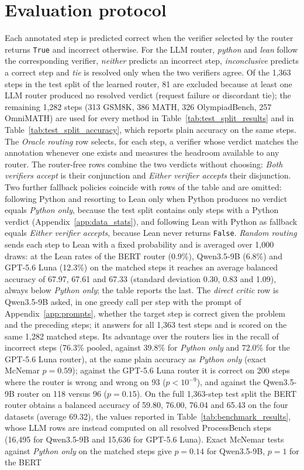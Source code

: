 \section{Evaluation protocol}
\label{app:evaluation}
Each annotated step is predicted correct when the verifier selected by the router returns \texttt{True} and incorrect otherwise. For the LLM router, \textit{python} and \textit{lean} follow the corresponding verifier, \textit{neither} predicts an incorrect step, \textit{inconclusive} predicts a correct step and \textit{tie} is resolved only when the two verifiers agree. Of the 1,363 steps in the test split of the learned router, 81 are excluded because at least one LLM router produced no resolved verdict (request failure or discordant tie); the remaining 1,282 steps (313 GSM8K, 386 MATH, 326 OlympiadBench, 257 OmniMATH) are used for every method in Table~\ref{tab:test_split_results} and in Table~\ref{tab:test_split_accuracy}, which reports plain accuracy on the same steps. The \emph{Oracle routing} row selects, for each step, a verifier whose verdict matches the annotation whenever one exists and measures the headroom available to any router. The router-free rows combine the two verdicts without choosing: \emph{Both verifiers accept} is their conjunction and \emph{Either verifier accepts} their disjunction. Two further fallback policies coincide with rows of the table and are omitted: following Python and resorting to Lean only when Python produces no verdict equals \emph{Python only}, because the test split contains only steps with a Python verdict (Appendix~\ref{app:data_stats}), and following Lean with Python as fallback equals \emph{Either verifier accepts}, because Lean never returns \texttt{False}. \emph{Random routing} sends each step to Lean with a fixed probability and is averaged over 1,000 draws: at the Lean rates of the BERT router (0.9\%), Qwen3.5-9B (6.8\%) and GPT-5.6 Luna (12.3\%) on the matched steps it reaches an average balanced accuracy of 67.97, 67.61 and 67.33 (standard deviation 0.30, 0.83 and 1.09), always below \emph{Python only}; the table reports the last. The \emph{direct critic} row is Qwen3.5-9B asked, in one greedy call per step with the prompt of Appendix~\ref{app:prompts}, whether the target step is correct given the problem and the preceding steps; it answers for all 1,363 test steps and is scored on the same 1,282 matched steps. Its advantage over the routers lies in the recall of incorrect steps (76.3\% pooled, against 39.8\% for \emph{Python only} and 72.0\% for the GPT-5.6 Luna router), at the same plain accuracy as \emph{Python only} (exact McNemar $p=0.59$); against the GPT-5.6 Luna router it is correct on 200 steps where the router is wrong and wrong on 93 ($p<10^{-9}$), and against the Qwen3.5-9B router on 118 versus 96 ($p=0.15$). On the full 1,363-step test split the BERT router obtains a balanced accuracy of 59.80, 76.00, 76.04 and 65.43 on the four datasets (average 69.32), the values reported in Table~\ref{tab:benchmark_results}, whose LLM rows are instead computed on all resolved ProcessBench steps (16,495 for Qwen3.5-9B and 15,636 for GPT-5.6 Luna). Exact McNemar tests against \emph{Python only} on the matched steps give $p=0.14$ for Qwen3.5-9B, $p=1$ for the BERT 